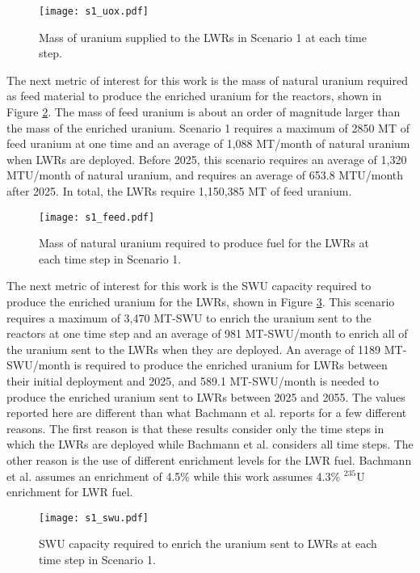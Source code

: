 \begin{figure}
    \centering
    \texttt{[image: s1\_uox.pdf]}
    \caption{Mass of uranium supplied to the LWRs in Scenario 1 at each time step.}
    \label{fig:fuel1}
\end{figure}

The next metric of interest for this work is the mass of natural uranium 
required as feed material to produce the enriched uranium for the 
reactors, shown in Figure \ref{fig:feed1}. The mass of feed uranium 
is about an order of magnitude larger than the mass of the enriched uranium. 
Scenario 1 requires a maximum of 2850 MT of 
feed uranium at one time and an average of 1,088 MT/month of natural uranium 
when \glspl{LWR} are deployed. Before 2025, this scenario requires an average of 
1,320 MTU/month of natural uranium, and requires an average of 653.8 MTU/month 
after 2025. In total, the \glspl{LWR} require 1,150,385 MT of feed uranium.

\begin{figure}
    \centering
    \texttt{[image: s1\_feed.pdf]}
    \caption{Mass of natural uranium required to produce fuel for the LWRs at each 
    time step in Scenario 1.}
    \label{fig:feed1}
\end{figure}

The next metric of interest for this work is the \gls{SWU} capacity required 
to produce the enriched uranium for the \glspl{LWR}, 
shown in Figure \ref{fig:swu1}. This scenario requires a maximum of 3,470 
MT-SWU to 
enrich the uranium sent to the reactors at one time step and an average of 
981 MT-SWU/month to enrich all of the uranium sent to 
the \glspl{LWR} when they are deployed. An average of 
1189 MT-SWU/month is required to produce the enriched uranium 
for \glspl{LWR} between their initial deployment and 2025, and 
589.1 MT-SWU/month is needed to produce the 
enriched uranium sent to \glspl{LWR} between 2025 and 2055. The values 
reported here are different than what Bachmann et al. \cite{bachmann_enrichment_2021}
reports for a few different reasons. The first reason is that these results  
consider only
the time steps in which the \glspl{LWR} are deployed while Bachmann et al. 
considers all time steps. The other reason
is the use of different enrichment levels for the \gls{LWR} fuel. 
Bachmann et al. assumes an enrichment of 4.5\% while this work assumes 4.3\%
$^{235}$U enrichment for \gls{LWR} fuel. 


\begin{figure}
    \centering
    \texttt{[image: s1\_swu.pdf]}
    \caption{SWU capacity required to enrich the uranium sent to LWRs at each time step in Scenario 1.}
    \label{fig:swu1}
\end{figure}

